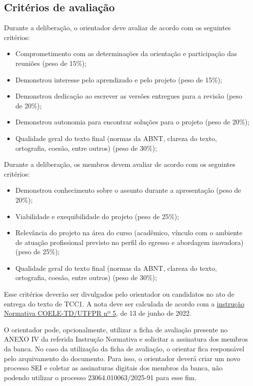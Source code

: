 \documentclass[a4paper, 12pt]{article}
\newcommand{\seiprocess}{23064.010063/2025-91} %
\begin{document}
	\subsection{Critérios de avaliação}

	Durante a deliberação, o orientador deve avaliar de acordo com os seguintes critérios:

	\begin{itemize}
		\item Comprometimento com as determinações da orientação e participação das reuniões (peso de 15\%);
		\item Demonstrou interesse pelo aprendizado e pelo projeto (peso de 15\%);
		\item Demonstrou dedicação ao escrever as versões entregues para a revisão (peso de 20\%);
		\item Demonstrou autonomia para encontrar soluções para o projeto (peso de 20\%);
		\item Qualidade geral do texto final (normas da ABNT, clareza do texto, ortografia, coesão, entre outros) (peso de 30\%);
	\end{itemize}

	Durante a deliberação, os membros devem avaliar de acordo com os seguintes critérios:

	\begin{itemize}
		\item Demonstrou conhecimento sobre o assunto durante a apresentação (peso de 20\%);
		\item Viabilidade e exequibilidade do projeto (peso de 25\%);
		\item Relevância do projeto na área do curso (acadêmico, vínculo com o ambiente de atuação profissional previsto no perfil do egresso e abordagem inovadora) (peso de 25\%);
		\item Qualidade geral do texto final (normas da ABNT, clareza do texto, ortografia, coesão, entre outros) (peso de 30\%);
	\end{itemize}

 	Esse critérios deverão ser divulgados pelo orientador ou candidatos no ato de entrega do texto de TCC1. A nota deve ser calculada de acordo com a \href{https://sei.utfpr.edu.br/sei/publicacoes/controlador_publicacoes.php?acao=publicacao_visualizar&id_documento=3053252&id_orgao_publicacao=0}{instrução Normativa COELE-TD/UTFPR nº 5}, de  13 de junho de 2022. 
	
	O orientador pode, opcionalmente, utilizar a ficha de avaliação presente no ANEXO IV da referida Instrução Normativa e solicitar a assinatura dos membros da banca. No caso da utilização da ficha de avaliação, o orientar fica responsável pelo arquivamento do documento. Para isso, o orientador deverá criar um novo processo SEI e coletar as assinaturas digitais dos membros da banca, não podendo utilizar o processo \seiprocess{} para esse fim.
\end{document}
